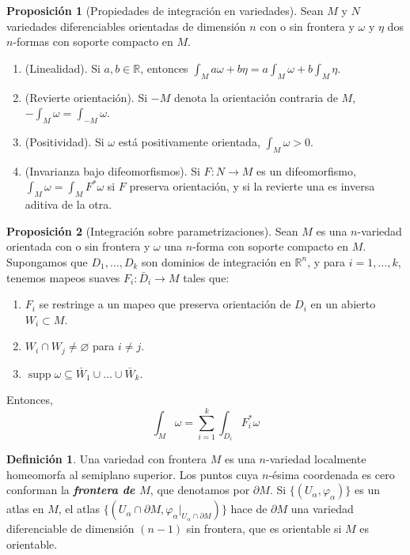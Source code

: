 \documentclass[spanish]{article}
\theoremstyle{definition}
\newtheorem*{defn}{Definición}
\newtheorem*{prop}{Proposición}
\newcommand{\R}{\mathbb{R}}
\DeclareMathOperator{\supp}{supp}
\begin{document}
	\begin{prop}[Propiedades de integración en variedades]
		Sean $M$ y $N$ variedades diferenciables orientadas de dimensión $n$ con o sin frontera y $\omega$ y $\eta$ dos $n$-formas con soporte compacto en $M$.
		\begin{enumerate}
			\item (Linealidad). Si $a,b\in\R$, entonces $\int_Ma\omega+b\eta=a\int_M\omega+b\int_M\eta$.
			
			\item (Revierte orientación). Si $-M$ denota la orientación contraria de $M$, $-\int_M\omega=\int_{-M}\omega$.
			
			\item (Positividad). Si $\omega$ está positivamente orientada, $\int_M\omega>0$.
			
			\item (Invarianza bajo difeomorfismos). Si $F:N\to M$ es un difeomorfismo, $\int_M\omega=\int_M F^*\omega$ si $F$ preserva orientación, y si la revierte una es inversa aditiva de la otra.
		\end{enumerate}
	\end{prop}
	\begin{prop}[Integración sobre parametrizaciones]
		Sean $M$ es una $n$-variedad orientada con o sin frontera y $\omega$ una $n$-forma con soporte compacto en $M$. Supongamos que $D_1,\ldots,D_k$ son dominios de integración en $\R^n$, y para $i=1,\ldots,k$, tenemos mapeos suaves $F_i:\bar{D}_i\to M$ tales que:
		\begin{enumerate}
			\item $F_i$ se restringe a un mapeo que preserva orientación de $D_i$ en un abierto $W_i\subset M$.
			\item $W_i\cap W_j\neq\varnothing$ para $i\neq j$.
			\item $\supp \omega\subseteq\bar{W}_1\cup\ldots\cup\bar{W}_k$.
		\end{enumerate}
		Entonces,
		\[\int_M\omega=\sum_{i=1}^k\int_{D_i}F^*_i\omega\]
	\end{prop}
	\iffalse
	\begin{prop}[Pullback de formas de grado máximo]
		Si $F:M\to N$ es una función suave entre las variedades $M$ y $N$ con con coordenadas locales $(x^i)$ en $U\subset M$ y $(y^i)$ en $V\subset N$, y si $u$ es cualquier función real-valuada en $N$,
		\[F^*(udy^1\wedge\ldots\wedge dy^n)=(\det DF)(u\circ F)dx^1\wedge\ldots\wedge dx^n\]
		donde $DF$ es la matriz jacobiana de la diferencial $F_*$.
	\end{prop}\fi
	\begin{defn}
		Una variedad con frontera $M$ es una $n$-variedad localmente homeomorfa al semiplano superior. Los puntos cuya $n$-ésima coordenada es cero conforman la \textbf{\textit{frontera de $M$}}, que denotamos por $\partial M$. Si $\{(U_\alpha,\varphi_\alpha)\}$ es un atlas en $M$, el atlas $\{(U_\alpha\cap\partial M,\varphi_{\alpha}|_{U_\alpha\cap\partial M})\}$ hace de $\partial M$ una variedad diferenciable de dimensión $(n-1)$ sin frontera, que es orientable si $M$ es orientable.
	\end{defn}
	
\end{document}
